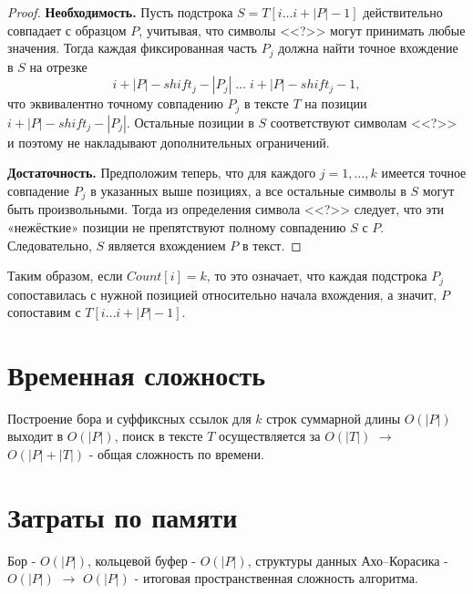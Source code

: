 \documentclass{article}
\begin{document}
\begin{proof}
    \textbf{Необходимость.}
    Пусть подстрока $S = T[i \dots i + |P| - 1]$ действительно совпадает с образцом $P$, учитывая, что символы <<?>> могут принимать любые значения. Тогда каждая фиксированная часть $P_j$ должна найти точное вхождение в $S$ на отрезке
    \[
        i + |P| - shift_j - |P_j|\;\dots\;i + |P| - shift_j - 1,
    \]
    что эквивалентно точному совпадению $P_j$ в тексте $T$ на позиции $i + |P| - shift_j - |P_j|$. Остальные позиции в $S$ соответствуют символам <<?>> и поэтому не накладывают дополнительных ограничений.

    \medskip

    \textbf{Достаточность.}
    Предположим теперь, что для каждого $j=1,\dots,k$ имеется точное совпадение $P_j$ в указанных выше позициях, а все остальные символы в $S$ могут быть произвольными. Тогда из определения символа <<?>> следует, что эти «нежёсткие» позиции не препятствуют полному совпадению $S$ с $P$. Следовательно, $S$ является вхождением $P$ в текст.
\end{proof}

Таким образом, если $Count[i] = k$, то это означает, что каждая подстрока $P_j$ сопоставилась с нужной позицией относительно начала вхождения, а значит, $P$ сопоставим с $T[i \ldots i + |P| - 1]$.

\section{Временная сложность}
Построение бора и суффиксных ссылок для $k$ строк суммарной длины $O(|P|)$ выходит в $O(|P|)$, поиск в тексте $T$ осуществляется за $O(|T|)$ $\to$ $O(|P| + |T|)$ - общая сложность по времени.

\section{Затраты по памяти}
Бор - $O(|P|)$, кольцевой буфер - $O(|P|)$, структуры данных Ахо–Корасика - $O(|P|)$ $\to$ $O(|P|)$ - итоговая пространственная сложность алгоритма.
\end{document}
